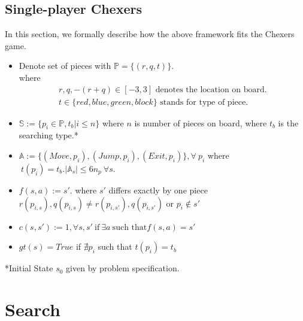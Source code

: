 \documentclass[11pt,a4paper]{article}
\begin{document}
    \subsection{Single-player Chexers}
    In this section, we formally describe how the above framework fits the Chexers game.
    \begin{itemize}
        \itemsep0em
        \item Denote set of pieces with $\mathbb{P}=\{(r, q, t)\}$. \\
        where
        \begin{align*}
            \text{$r, q, -(r+q)\in [-3, 3]$ denotes the location on board.}\\
            \text{$t\in \{red, blue, green, block\}$ stands for type of piece.}    
        \end{align*}
        
        \item $\mathbb{S} := \{p_i\in \mathbb{P}, t_b|i\le n\}$ where $n$ is number of pieces on board, where $t_b$ is the searching type.*
        \item $\mathbb{A} := \{(Move,p_i), (Jump, p_i), (Exit, p_i)\}, \forall\ p_i $ where$\ t(p_i)=t_b. | \mathbb{A}_s| \le 6n_p\ \forall s$.
        \item $f(s, a) := s'$. where $s'$ differs exactly by one piece $r(p_{i,s}), q(p_{i,s}) \ne r(p_{i,s'}), q(p_{i,s'})$ or $p_i\notin s'$
        \item $c(s, s') := 1, \forall s, s'\ \text{if}\ \exists a\ \text{such that} f(s, a) = s'$
        \item $gt(s) = True$ if $\nexists p_i$ such that $t(p_i) = t_b$
    \end{itemize}
    *Initial State $s_0$ given by problem specification.
    \vspace{-5pt}
    \section{Search}
\end{document}

